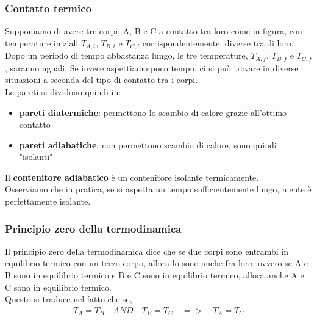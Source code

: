         \subsubsection{Contatto termico}
            Supponiamo di avere tre corpi, A, B e C a contatto tra loro come in figura, con temperature iniziali $T_{A,i}$, $T_{B,i}$ e $T_{C,i}$ corrispondentemente, diverse tra di loro.\\
            Dopo un periodo di tempo abbastanza lungo, le tre temperature, $T_{A,f}$, $T_{B,f}$ e $T_{C,f}$, saranno uguali. Se invece aspettiamo poco tempo, ci si può trovare in diverse situazioni a seconda del tipo di contatto tra i corpi.\\
            Le pareti si dividono quindi in:
            \begin{itemize}
                \item \textbf{pareti diatermiche}: permettono lo scambio di calore grazie all'ottimo contatto\\
                \item \textbf{pareti adiabatiche}: non permettono scambio di calore, sono quindi "isolanti"
            \end{itemize}
            Il \textbf{contenitore adiabatico} è un contenitore isolante termicamente.\\
            Osserviamo che in pratica, se si aspetta un tempo sufficientemente lungo, niente è perfettamente isolante.

        \subsubsection{Principio zero della termodinamica}
            Il principio zero della termodinamica dice che se due corpi sono entrambi in equilibrio termico con un terzo corpo, allora lo sono anche fra loro, ovvero se A e B sono in equilibrio termico e B e C sono in equilibrio termico, allora anche A e C sono in equilibrio termico.\\
            Questo si traduce nel fatto che se,
            \begin{align*}
                T_A=T_B\quad AND\quad T_B=T_C\quad =>\quad T_A=T_C
            \end{align*}


